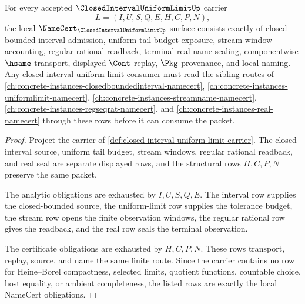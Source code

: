 \begin{theorem}
\label{thm:closed-interval-uniform-limit-namecert-obligations}
For every accepted $\ClosedIntervalUniformLimitUp$ carrier
$$
L=(I,U,S,Q,E,H,C,P,N),
$$
the local $\NameCert_{\ClosedIntervalUniformLimitUp}$ surface consists exactly of closed-bounded-interval admission, uniform-tail budget exposure, stream-window accounting, regular rational readback, terminal real-name sealing, componentwise $\hsame$ transport, displayed $\Cont$ replay, $\Pkg$ provenance, and local naming. Any closed-interval uniform-limit consumer must read the sibling routes of \autoref{ch:concrete-instances-closedboundedinterval-namecert}, \autoref{ch:concrete-instances-uniformlimit-namecert}, \autoref{ch:concrete-instances-streamname-namecert}, \autoref{ch:concrete-instances-regseqrat-namecert}, and \autoref{ch:concrete-instances-real-namecert} through these rows before it can consume the packet.
\end{theorem}
\begin{proof}
Project the carrier of \autoref{def:closed-interval-uniform-limit-carrier}. The closed interval source, uniform tail budget, stream windows, regular rational readback, and real seal are separate displayed rows, and the structural rows $H,C,P,N$ preserve the same packet.

The analytic obligations are exhausted by $I,U,S,Q,E$. The interval row supplies the closed-bounded source, the uniform-limit row supplies the tolerance budget, the stream row opens the finite observation windows, the regular rational row gives the readback, and the real row seals the terminal observation.

The certificate obligations are exhausted by $H,C,P,N$. These rows transport, replay, source, and name the same finite route. Since the carrier contains no row for Heine--Borel compactness, selected limits, quotient functions, countable choice, host equality, or ambient completeness, the listed rows are exactly the local NameCert obligations.
\end{proof}

